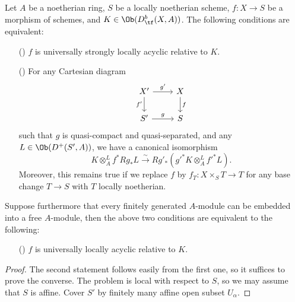 \begin{theorem}\label{scheme morphism locally acyclity and base change theorem iff}
Let $A$ be a noetherian ring, $S$ be a locally noetherian scheme, $f:X\to S$ be a morphism of schemes, and $K\in\Ob(D^b_{\tf}(X,A))$. The following conditions are equivalent:
\begin{enumerate}
    \item[(\rmnum{1})] $f$ is universally strongly locally acyclic relative to $K$.
    \item[(\rmnum{2})] For any Cartesian diagram
    \[\begin{tikzcd}
    X'\ar[r,"g'"]\ar[d,swap,"f'"]&X\ar[d,"f"]\\
    S'\ar[r,"g"]&S
    \end{tikzcd}\]
    such that $g$ is quasi-compact and quasi-separated, and any $L\in\Ob(D^+(S',A))$, we have a canonical isomorphism
    \[K\otimes_A^Lf^*Rg_*L\stackrel{\sim}{\to} Rg'_*(g'^*K\otimes_A^Lf'^*L).\]
    Moreover, this remains true if we replace $f$ by $f_T:X\times_ST\to T$ for any base change $T\to S$ with $T$ locally noetherian.
\end{enumerate}
Suppose furthermore that every finitely generated $A$-module can be embedded into a free $A$-module, then the above two conditions are equivalent to the following:
\begin{enumerate}
    \item[(\rmnum{3})] $f$ is universally locally acyclic relative to $K$.
\end{enumerate}
\end{theorem}
\begin{proof}
The second statement follows easily from the first one, so it suffices to prove the converse. The problem is local with respect to $S$, so we may assume that $S$ is affine. Cover $S'$ by finitely many affine open subset $U_\alpha$.
\end{proof}

